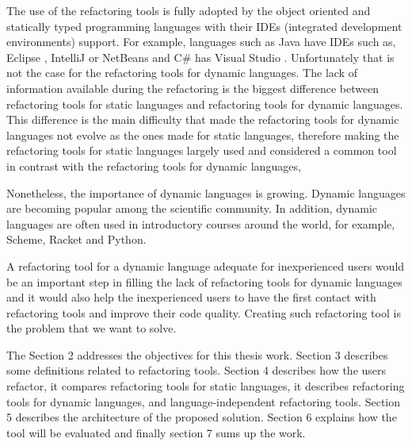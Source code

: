 The use of the refactoring tools is fully adopted by the object oriented and statically typed programming languages with their IDEs (integrated development environments) support.
For example, languages such as Java have IDEs such as, Eclipse \cite{carlson2005eclipse}, IntelliJ \cite{bock2011intellij} or NetBeans \cite{boudreau2002netbeans} and C\# has Visual Studio \cite{guckenheimer2006software}.
Unfortunately that is not the case for the refactoring tools for dynamic languages. 
The lack of information available during the refactoring is the biggest difference between refactoring tools for static languages and refactoring tools for dynamic languages.
This difference is the main difficulty that made the refactoring tools for dynamic languages not evolve as the ones made for static languages, therefore making the refactoring tools for static languages largely used and considered a common tool in contrast with the refactoring tools for dynamic languages,   

Nonetheless, the importance of dynamic languages is growing. Dynamic languages are becoming popular among the scientific community.
In addition, dynamic languages are often used in introductory courses around the world, for example, Scheme, Racket and Python.

A refactoring tool for a dynamic language adequate for inexperienced users would be an important step in filling the lack of refactoring tools for dynamic languages and it would also help the inexperienced users to have the first contact with refactoring tools and improve their code quality. Creating such refactoring tool is the problem that we want to solve.



The Section 2 addresses the objectives for this thesis work. 
Section 3 describes some definitions related to refactoring tools.
Section 4 describes how the users refactor, it compares refactoring tools for static languages, it describes refactoring tools for dynamic languages, and language-independent refactoring tools.
Section 5 describes the architecture of the proposed solution. 
Section 6 explains how the tool will be evaluated and finally section 7 sums up the work.







